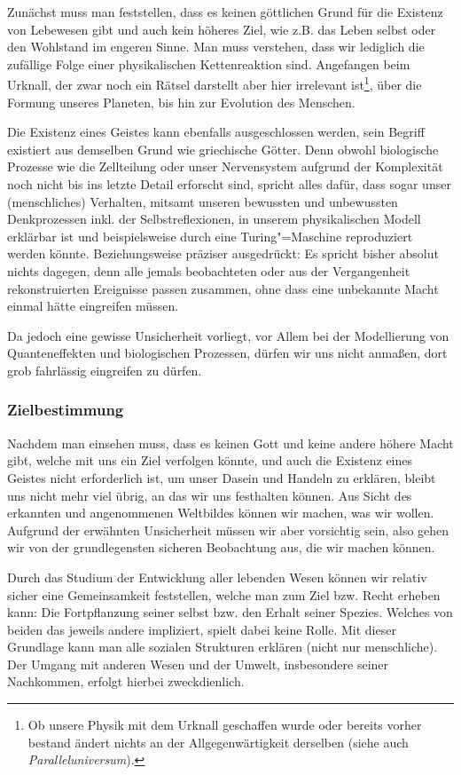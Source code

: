 Zunächst muss man feststellen, dass es keinen göttlichen Grund für die Existenz von Lebewesen gibt und auch kein höheres Ziel, wie z.B. das Leben selbst oder den Wohlstand im engeren Sinne. Man muss verstehen, dass wir lediglich die zufällige Folge einer physikalischen Kettenreaktion sind. Angefangen beim Urknall, der zwar noch ein Rätsel darstellt aber hier irrelevant ist\footnote{Ob unsere Physik mit dem Urknall geschaffen wurde oder bereits vorher bestand ändert nichts an der Allgegenwärtigkeit derselben (siehe auch \textit{Paralleluniversum}).}, über die Formung unseres Planeten, bis hin zur Evolution des Menschen.

Die Existenz eines Geistes kann ebenfalls ausgeschlossen werden, sein Begriff existiert aus demselben Grund wie griechische Götter. Denn obwohl biologische Prozesse wie die Zellteilung oder unser Nervensystem aufgrund der Komplexität noch nicht bis ins letzte Detail erforscht sind, spricht alles dafür, dass sogar unser (menschliches) Verhalten, mitsamt unseren bewussten und unbewussten Denkprozessen inkl. der Selbstreflexionen, in unserem physikalischen Modell erklärbar ist und beispielsweise durch eine Turing"=Maschine reproduziert werden könnte. Beziehungsweise präziser ausgedrückt: Es spricht bisher absolut nichts dagegen, denn alle jemals beobachteten oder aus der Vergangenheit rekonstruierten Ereignisse passen zusammen, ohne dass eine unbekannte Macht einmal hätte eingreifen müssen.

Da jedoch eine gewisse Unsicherheit vorliegt, vor Allem bei der Modellierung von Quanteneffekten und biologischen Prozessen, dürfen wir uns nicht anmaßen, dort grob fahrlässig eingreifen zu dürfen.

\subsubsection{Zielbestimmung}

Nachdem man einsehen muss, dass es keinen Gott und keine andere höhere Macht gibt, welche mit uns ein Ziel verfolgen könnte, und auch die Existenz eines Geistes nicht erforderlich ist, um unser Dasein und Handeln zu erklären, bleibt uns nicht mehr viel übrig, an das wir uns festhalten können. Aus Sicht des erkannten und angenommenen Weltbildes können wir machen, was wir wollen. Aufgrund der erwähnten Unsicherheit müssen wir aber vorsichtig sein, also gehen wir von der grundlegensten sicheren Beobachtung aus, die wir machen können.

Durch das Studium der Entwicklung aller lebenden Wesen können wir relativ sicher eine Gemeinsamkeit feststellen, welche man zum Ziel bzw. Recht erheben kann: Die Fortpflanzung seiner selbst bzw. den Erhalt seiner Spezies. Welches von beiden das jeweils andere impliziert, spielt dabei keine Rolle. Mit dieser Grundlage kann man alle sozialen Strukturen erklären (nicht nur menschliche). Der Umgang mit anderen Wesen und der Umwelt, insbesondere seiner Nachkommen, erfolgt hierbei zweckdienlich.

